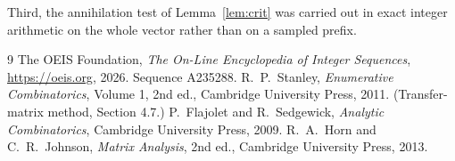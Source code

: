 \documentclass[11pt,a4paper]{article}
\theoremstyle{plain}
\theoremstyle{definition}
\begin{document}
Third, the annihilation test of Lemma~\ref{lem:crit} was carried out in exact integer
arithmetic on the whole vector rather than on a sampled prefix.

\begin{thebibliography}{9}
 The OEIS Foundation, \emph{The On-Line Encyclopedia of Integer
Sequences}, \url{https://oeis.org}, 2026. Sequence A235288.
 R.~P.~Stanley, \emph{Enumerative Combinatorics}, Volume 1, 2nd ed.,
Cambridge University Press, 2011. (Transfer-matrix method, Section 4.7.)
 P.~Flajolet and R.~Sedgewick, \emph{Analytic Combinatorics}, Cambridge
University Press, 2009.
 R.~A.~Horn and C.~R.~Johnson, \emph{Matrix Analysis}, 2nd ed., Cambridge
University Press, 2013.
\end{thebibliography}
\end{document}
